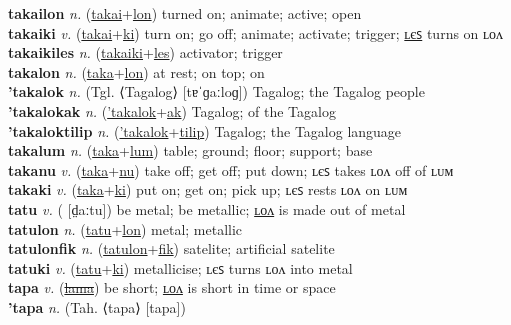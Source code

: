 \textbf{takailon} \textit{n.} (\hyperref[takai]{takai}+\hyperref[lon]{lon})
turned on; animate; active; open \label{takailon} \\
\textbf{takaiki} \textit{v.} (\hyperref[takai]{takai}+\hyperref[ki]{ki})
turn on; go off; animate; activate; trigger; \hyperref[takaikiles]{ʟєꜱ} turns on ʟᴏᴧ \label{takaiki} \\
\textbf{takaikiles} \textit{n.} (\hyperref[takaiki]{takaiki}+\hyperref[les]{les})
activator; trigger \label{takaikiles} \\
\textbf{takalon} \textit{n.} (\hyperref[taka]{taka}+\hyperref[lon]{lon})
at rest; on top; on \label{takalon} \\
\textbf{'takalok} \textit{n.} (Tgl. ⟨Tagalog⟩ [tɐˈɡaːloɡ])
Tagalog; the Tagalog people \label{'takalok} \\
\textbf{'takalokak} \textit{n.} (\hyperref['takalok]{'takalok}+\hyperref[ak]{ak})
Tagalog; of the Tagalog \label{'takalokak} \\
\textbf{'takaloktilip} \textit{n.} (\hyperref['takalok]{'takalok}+\hyperref[tilip]{tilip})
Tagalog; the Tagalog language \label{'takaloktilip} \\
\textbf{takalum} \textit{n.} (\hyperref[taka]{taka}+\hyperref[lum]{lum})
table; ground; floor; support; base \label{takalum} \\
\textbf{takanu} \textit{v.} (\hyperref[taka]{taka}+\hyperref[nu]{nu})
take off; get off; put down; ʟєꜱ takes ʟᴏᴧ off of ʟᴜᴍ \label{takanu} \\
\textbf{takaki} \textit{v.} (\hyperref[taka]{taka}+\hyperref[ki]{ki})
put on; get on; pick up; ʟєꜱ rests ʟᴏᴧ on ʟᴜᴍ \label{takaki} \\
\textbf{tatu} \textit{v.} ( [d̤aːtu])
be metal; be metallic; \hyperref[tatulon]{ʟᴏᴧ} is made out of metal \label{tatu} \\
\textbf{tatulon} \textit{n.} (\hyperref[tatu]{tatu}+\hyperref[lon]{lon})
metal; metallic \label{tatulon} \\
\textbf{tatulonfik} \textit{n.} (\hyperref[tatulon]{tatulon}+\hyperref[fik]{fik})
satelite; artificial satelite \label{tatulonfik} \\
\textbf{tatuki} \textit{v.} (\hyperref[tatu]{tatu}+\hyperref[ki]{ki})
metallicise; ʟєꜱ turns ʟᴏᴧ into metal \label{tatuki} \\
\textbf{tapa} \textit{v.} (\hyperref[lama]{\sout{lama}})
be short; \hyperref[tapalon]{ʟᴏᴧ} is short in time or space \label{tapa} \\
\textbf{'tapa} \textit{n.} (Tah. ⟨tapa⟩ [tapa])
